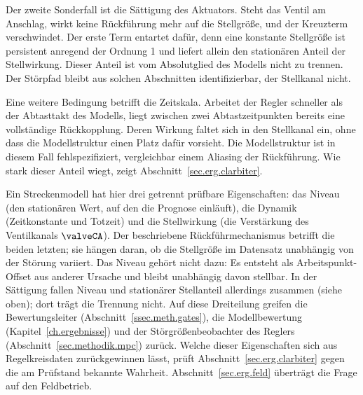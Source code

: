 Der zweite Sonderfall ist die Sättigung des Aktuators. Steht das Ventil
am Anschlag, wirkt keine Rückführung mehr auf die Stellgröße, und der
Kreuzterm verschwindet. Der erste Term entartet dafür, denn eine
konstante Stellgröße ist persistent anregend der Ordnung 1 und liefert
allein den stationären Anteil der Stellwirkung. Dieser Anteil ist vom
Absolutglied des Modells nicht zu trennen. Der Störpfad bleibt aus
solchen Abschnitten identifizierbar, der Stellkanal nicht.

Eine weitere Bedingung betrifft die Zeitskala. Arbeitet der Regler
schneller als der Abtasttakt des Modells, liegt zwischen zwei
Abtastzeitpunkten bereits eine vollständige Rückkopplung. Deren Wirkung
faltet sich in den Stellkanal ein, ohne dass die Modellstruktur einen
Platz dafür vorsieht. Die Modellstruktur ist in diesem Fall
fehlspezifiziert, vergleichbar einem Aliasing der Rückführung. Wie stark
dieser Anteil wiegt, zeigt Abschnitt~\ref{sec.erg.clarbiter}.

Ein Streckenmodell hat hier drei getrennt prüfbare Eigenschaften: das
Niveau (den stationären Wert, auf den die Prognose einläuft), die
Dynamik (Zeitkonstante und Totzeit) und die Stellwirkung (die
Verstärkung des Ventilkanals $\valveCA$). Der beschriebene
Rückführmechanismus betrifft die beiden letzten; sie hängen daran, ob
die Stellgröße im Datensatz unabhängig von der Störung variiert. Das
Niveau gehört nicht dazu: Es entsteht als Arbeitspunkt-Offset aus
anderer Ursache und bleibt unabhängig davon stellbar. In der Sättigung
fallen Niveau und stationärer Stellanteil allerdings zusammen (siehe
oben); dort trägt die Trennung nicht. Auf diese Dreiteilung greifen
die Bewertungsleiter (Abschnitt~\ref{ssec.meth.gates}), die
Modellbewertung (Kapitel~\ref{ch.ergebnisse}) und der
Störgrößenbeobachter des Reglers (Abschnitt~\ref{sec.methodik.mpc})
zurück. Welche dieser Eigenschaften sich aus Regelkreisdaten
zurückgewinnen lässt, prüft Abschnitt~\ref{sec.erg.clarbiter} gegen
die am Prüfstand bekannte Wahrheit.
Abschnitt~\ref{sec.erg.feld} überträgt die Frage auf den Feldbetrieb.

















